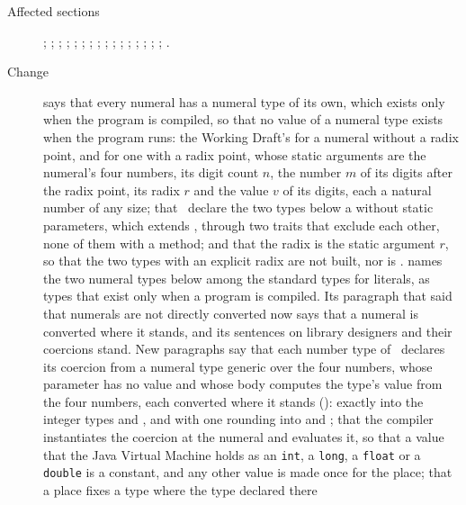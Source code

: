 \begin{description}
\item[Affected sections] ; ; ;
; ; ;
;
; ; ;
;
; ;
; ;
; .
\item[Change]  says that every numeral has a numeral type of
its own, which exists only when the program is compiled, so that no value of a
numeral type exists when the program runs: the Working Draft's
 for a numeral without a
radix point, and  for
one with a radix point, whose static arguments are the numeral's four numbers,
its digit count $n$, the number $m$ of its digits after the radix point, its
radix $r$ and the value $v$ of its digits, each a natural number of any size;
that \library\ declare the two types below a  without static
parameters, which extends , through two traits that exclude each
other, none of them with a method; and that the radix is the static argument
$r$, so that the two types with an explicit radix are not built, nor is
.
 names the two numeral types below  among
the standard types for literals, as types that exist only when a program is
compiled.
Its paragraph that said that numerals are not directly converted now says that a
numeral is converted where it stands, and its sentences on library designers
and their coercions stand.
New paragraphs say that each number type of \library\ declares its coercion from
a numeral type generic over the four numbers, whose parameter has no value and
whose body computes the type's value from the four numbers, each converted where
it stands (): exactly into the integer types and , and
with one rounding into  and ; that the
compiler instantiates the coercion at the numeral and evaluates it, so that a
value that the Java Virtual Machine holds as an \texttt{int}, a \texttt{long}, a
\texttt{float} or a \texttt{double} is a constant, and any other value is made
once for the place; that a place fixes a type where the type declared there

\end{description}
